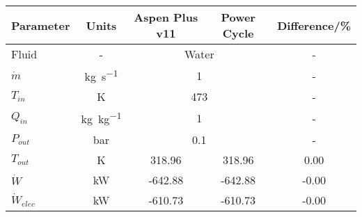 \begin{tabular}{|p{2.5cm} c c c c|}
    \hline
    \rowcolor{bluepoli!40} %
    \textbf{Parameter} & \textbf{Units} & \textbf{Aspen Plus v11} & \textbf{Power Cycle} & \textbf{Difference/\unit{\percent}} \T\B \\
    \hline \hline
    Fluid & - & \multicolumn{2}{c}{Water} & - \T\B\\
    \(\Dot{m}\)  & \unit{\kg\per\s} & \multicolumn{2}{c}{\num{1}} & - \T\B\\
    \(T_{in}\) & \unit{\K} & \multicolumn{2}{c}{\num{473}} & - \T\B\\
    \(Q_{in}\) & \unit{\kg\per\kg} & \multicolumn{2}{c}{\num{1}} & - \T\B\\
    \(P_{out}\) & \unit{\bar} & \multicolumn{2}{c}{\num{0.1}} & - \T\B\\
    \hline\hline
    \(T_{out}\) & \unit{\K} & 318.96 & 318.96 & 0.00 \T\B\\
    \(\Dot{W}\) & \unit{\kilo\watt} & -642.88 & -642.88 & -0.00 \T\B\\
    \(\Dot{W}_{elec}\) & \unit{\kilo\watt} & -610.73 & -610.73 & -0.00 \T\B\\
    \hline
\end{tabular}